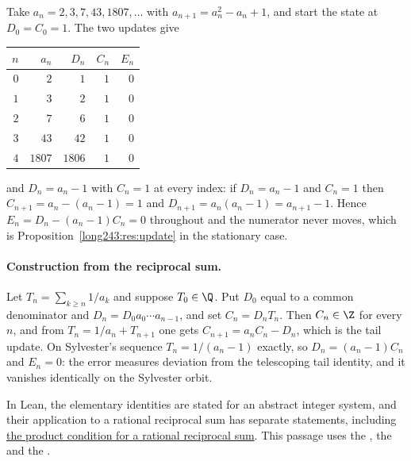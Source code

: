 \begin{example}\label{long243:ex:sylvester}
Take $a_n=2,3,7,43,1807,\ldots$ with $a_{n+1}=a_n^{2}-a_n+1$, and start the
state at $D_0=C_0=1$.  The two updates give

\begin{center}
\begin{tabular}{@{}rrrrr@{}}
\toprule
$n$ & $a_n$ & $D_n$ & $C_n$ & $E_n$\\
\midrule
$0$ & $2$ & $1$ & $1$ & $0$\\
$1$ & $3$ & $2$ & $1$ & $0$\\
$2$ & $7$ & $6$ & $1$ & $0$\\
$3$ & $43$ & $42$ & $1$ & $0$\\
$4$ & $1807$ & $1806$ & $1$ & $0$\\
\bottomrule
\end{tabular}
\end{center}

\noindent and $D_n=a_n-1$ with $C_n=1$ at every index: if $D_n=a_n-1$ and
$C_n=1$ then $C_{n+1}=a_n-(a_n-1)=1$ and $D_{n+1}=a_n(a_n-1)=a_{n+1}-1$.
Hence $E_n=D_n-(a_n-1)C_n=0$ throughout and the numerator never moves, which
is Proposition~\ref{long243:res:update} in the stationary case.
\end{example}

\paragraph{Construction from the reciprocal sum.}
Let $T_n=\sum_{k\ge n}1/a_k$ and suppose $T_0\in\Q$.  Put $D_0$ equal to a
common denominator and $D_n=D_0a_0\cdots a_{n-1}$, and set $C_n=D_nT_n$.  Then
$C_n\in\Z$ for every $n$, and from $T_n=1/a_n+T_{n+1}$ one gets
$C_{n+1}=a_nC_n-D_n$, which is the tail update.  On Sylvester's sequence
$T_n=1/(a_n-1)$ exactly, so $D_n=(a_n-1)C_n$ and $E_n=0$: the error
measures deviation from the telescoping tail identity, and it vanishes
identically on the Sylvester orbit.

In Lean, the elementary identities are stated for an abstract integer
system, and their application to a rational reciprocal sum has separate
statements, including
\href{https://github.com/wcook04/plectis-erdos/blob/3d6d938d696fed0fb71dd55115a18a73738ff223/lean/ErdosProblems/Erdos243/PaperCompleteR7/ProductDefect.lean\#L211}{the product condition for a rational reciprocal sum}.
This passage uses the
,
the 
and the .

